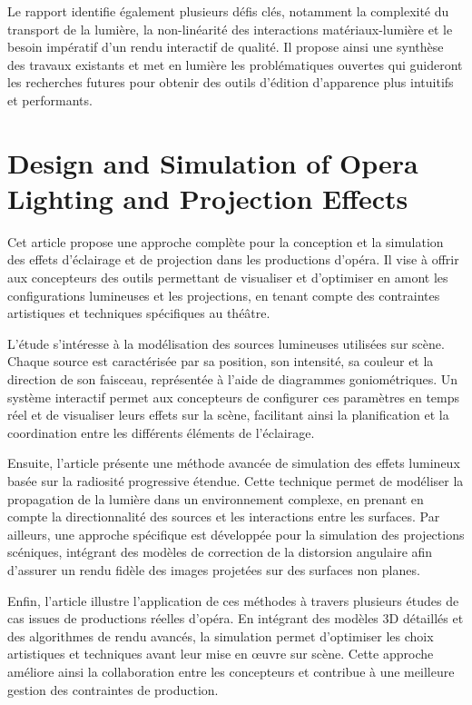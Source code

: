 \documentclass{article}
\begin{document}
Le rapport identifie également plusieurs défis clés, notamment la complexité du transport de la lumière, la non-linéarité des interactions 
matériaux-lumière et le besoin impératif d’un rendu interactif de qualité. Il propose ainsi une synthèse des travaux existants et met en lumière
les problématiques ouvertes qui guideront les recherches futures pour obtenir des outils d’édition d’apparence plus intuitifs et performants.

\section{Design and Simulation of  Opera Lighting and Projection Effects}
Cet article propose une approche complète pour la conception et la simulation des effets d’éclairage et de projection dans les productions d’opéra. 
Il vise à offrir aux concepteurs des outils permettant de visualiser et d’optimiser en amont les configurations lumineuses et les projections, en 
tenant compte des contraintes artistiques et techniques spécifiques au théâtre.

L’étude s’intéresse à la modélisation des sources lumineuses utilisées sur scène. Chaque source est caractérisée par sa position, 
son intensité, sa couleur et la direction de son faisceau, représentée à l’aide de diagrammes goniométriques. Un système interactif permet aux 
concepteurs de configurer ces paramètres en temps réel et de visualiser leurs effets sur la scène, facilitant ainsi la planification et 
la coordination entre les différents éléments de l’éclairage.

Ensuite, l’article présente une méthode avancée de simulation des effets lumineux basée sur la radiosité progressive étendue.
Cette technique permet de modéliser la propagation de la lumière dans un environnement complexe, en prenant en compte la directionnalité 
des sources et les interactions entre les surfaces. Par ailleurs, une approche spécifique est développée pour la simulation des projections 
scéniques, intégrant des modèles de correction de la distorsion angulaire afin d’assurer un rendu fidèle des images projetées sur des surfaces 
non planes.

Enfin, l’article illustre l’application de ces méthodes à travers plusieurs études de cas issues de productions réelles d’opéra. 
En intégrant des modèles 3D détaillés et des algorithmes de rendu avancés, la simulation permet d’optimiser les choix artistiques et techniques 
avant leur mise en œuvre sur scène. Cette approche améliore ainsi la collaboration entre les concepteurs et contribue à une meilleure gestion 
des contraintes de production.
\end{document}
